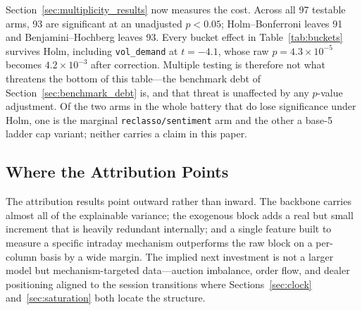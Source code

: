 Section~\ref{sec:multiplicity_results} now measures the cost. Across all 97
testable arms, 93 are significant at an unadjusted $p < 0.05$; Holm--Bonferroni
leaves 91 and Benjamini--Hochberg leaves 93. Every bucket effect in
Table~\ref{tab:buckets} survives Holm, including \texttt{vol\_demand} at
$t = -4.1$, whose raw $p = 4.3 \times 10^{-5}$ becomes $4.2 \times 10^{-3}$
after correction. Multiple testing is therefore not what threatens the bottom
of this table---the benchmark debt of Section~\ref{sec:benchmark_debt} is, and
that threat is unaffected by any $p$-value adjustment. Of the two arms in the
whole battery that do lose significance under Holm, one is the marginal
\texttt{reclasso/sentiment} arm and the other a base-5 ladder cap variant;
neither carries a claim in this paper.

\subsection{Where the Attribution Points}
\label{sec:attribution_points}

The attribution results point outward rather than inward. The backbone carries
almost all of the explainable variance; the exogenous block adds a real but
small increment that is heavily redundant internally; and a single feature
built to measure a specific intraday mechanism outperforms the raw block on a
per-column basis by a wide margin. The implied next investment is not a larger
model but mechanism-targeted data---auction imbalance, order flow, and dealer
positioning aligned to the session transitions where
Sections~\ref{sec:clock} and~\ref{sec:saturation} both locate the structure.
